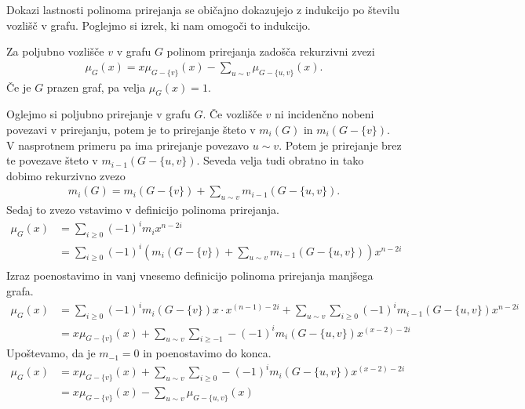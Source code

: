 Dokazi lastnosti polinoma prirejanja se običajno dokazujejo z indukcijo po številu vozlišč v grafu. Poglejmo si izrek, ki nam omogoči to indukcijo.
\begin{izrek}
    Za poljubno vozlišče \(v\) v grafu \(G\) polinom prirejanja zadošča rekurzivni zvezi
    \begin{align*}
        \mu_G(x) = x \mu_{G-\{v\}}(x) - \sum_{u\sim v} \mu_{G-\{u, v\}}(x).
    \end{align*}
    Če je \(G\) prazen graf, pa velja \(\mu_G(x) = 1\).
\end{izrek}
\begin{dokaz}
    Oglejmo si poljubno prirejanje v grafu \(G\). Če vozlišče \(v\) ni incidenčno nobeni povezavi v prirejanju, potem je to prirejanje šteto v \(m_i(G)\) in \(m_i({G-\{v\}})\). V nasprotnem primeru pa ima prirejanje povezavo \(u\sim v\). Potem je prirejanje brez te povezave šteto v \(m_{i-1}({G-\{u, v\}})\). Seveda velja tudi obratno in tako dobimo rekurzivno zvezo
    \begin{align*}
        m_i(G) = m_i({G-\{v\}}) + \sum_{u\sim v} m_{i-1}({G-\{u, v\}}).
    \end{align*}
    Sedaj to zvezo vstavimo v definicijo polinoma prirejanja.
    \begin{align*}
        \mu_G(x) & = \sum_{i\geq 0} (-1)^i m_i x^{n-2i}                                                                                             \\
                 & = \sum_{i\geq 0} (-1)^i \left( m_i({G-\{v\}}) + \sum_{u\sim v} m_{i-1}({G-\{u, v\}}) \right) x^{n-2i}                            \\
    \end{align*}
    Izraz poenostavimo in vanj vnesemo definicijo polinoma prirejanja manjšega grafa.
    \begin{align*}
        \mu_G(x) & = \sum_{i\geq 0} (-1)^i m_i({G-\{v\}}) x\cdot x^{(n-1)-2i} + \sum_{u\sim v} \sum_{i\geq 0} (-1)^i m_{i-1}({G-\{u, v\}}) x^{n-2i} \\
                 & = x \mu_{G-\{v\}}(x) + \sum_{u\sim v} \sum_{i \geq -1} -(-1)^i m_{i}(G-\{u, v\}) x^{(x-2)-2i}
    \end{align*}
    Upoštevamo, da je \(m_{-1} = 0\) in poenostavimo do konca.
    \begin{align*}
        \mu_G(x) & = x \mu_{G-\{v\}}(x) + \sum_{u\sim v} \sum_{i \geq 0} -(-1)^i m_{i}(G-\{u, v\}) x^{(x-2)-2i} \\
                 & = x \mu_{G-\{v\}}(x) - \sum_{u\sim v} \mu_{G-\{u, v\}}(x)
    \end{align*}
\end{dokaz}

